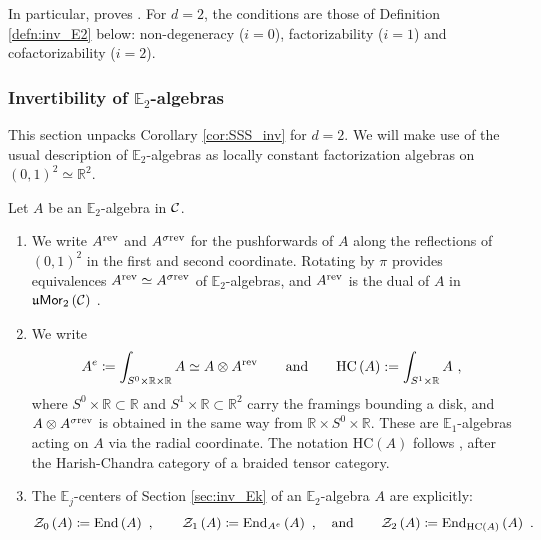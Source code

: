 In particular, \cite{SSS} proves \cite[Conjecture 1.9]{BJSS}.
For $d=2$, the conditions are those of Definition \ref{defn:inv_E2} below:
non-degeneracy ($i=0$), factorizability ($i=1$) and cofactorizability ($i=2$).

\subsubsection{Invertibility of \texorpdfstring{$\mathbb{E}_2$}{E2}-algebras}
\label{sec:inv_E2}

This section unpacks Corollary \ref{cor:SSS_inv} for $d=2$.
We will make use of the usual description of $\mathbb{E}_2$-algebras as locally constant
factorization algebras on $\left(0,1\right)^2 \simeq \mathbb{R}^2$.

\begin{nota}
\label{nota:E2}
Let $A$ be an $\mathbb{E}_2$-algebra in $\mathcal{C}$.
\begin{enumerate}
\item We write $A^{\text{rev}}$ and $A^{\sigma\text{rev}}$ for the pushforwards of $A$ along the
reflections of $\left(0,1\right)^2$ in the first and second coordinate. Rotating by $\pi$
provides equivalences $A^{\text{rev}}\simeq A^{\sigma\text{rev}}$ of $\mathbb{E}_2$-algebras, and
$A^{\text{rev}}$ is the dual of $A$ in $\mathfrak{u}\mathsf{Mor}_2\left(\mathcal{C}\right)$ \cite{GS}.
\item We write
\begin{equation*}
A^e\coloneqq \int_{S^0\times\mathbb{R}\times\mathbb{R}}A\simeq A\otimes A^{\text{rev}}\qquad\text{and}\qquad
\mathrm{HC}\left(A\right):=\int_{S^1\times\mathbb{R}}A \ ,
\end{equation*}
where $S^0\times\mathbb{R}\subset\mathbb{R}$ and $S^1\times\mathbb{R}\subset\mathbb{R}^2$
carry the framings bounding a disk, and $A\otimes A^{\sigma\text{rev}}$ is obtained in the same
way from $\mathbb{R}\times S^0\times\mathbb{R}$. These are $\mathbb{E}_1$-algebras acting on $A$ via the radial coordinate. The notation $\mathrm{HC}\left(A\right)$ follows \cite{BJSS}, after the Harish-Chandra category of a braided tensor category.
\item The $\mathbb{E}_j$-centers of Section \ref{sec:inv_Ek} of an $\mathbb{E}_2$-algebra
$A$ are explicitly:
\begin{equation*}
\mathcal{Z}_0\left(A\right) \coloneqq \operatorname{End}\left(A\right)  \ ,
\qquad
\mathcal{Z}_1\left(A\right) \coloneqq \operatorname{End}_{A^e}\left(A\right)  \ , \quad\text{and}
\qquad
\mathcal{Z}_2\left(A\right) \coloneqq \operatorname{End}_{\operatorname{HC}\left(A\right)}\left(A\right) \ .
\end{equation*}

\end{enumerate}
\end{nota}
